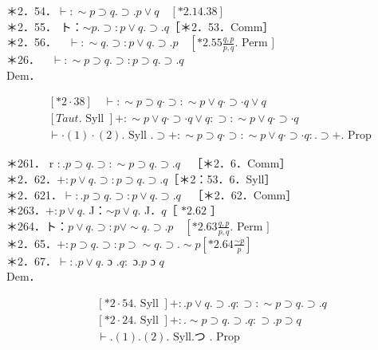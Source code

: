 \documentclass[10pt]{article}
\begin{document}
＊2．54．$\vdash: \sim p \supset q . \supset . p \vee q \quad[* 2.14 .38]$\\
＊2．55． ト：$\sim p . \supset: p \vee q . \supset . q$［＊2．53．Comm］\\
＊2．56．$\quad \vdash: \sim q . \supset: p \vee q . \supset . p \quad\left[* 2.55 \frac{q, p}{p, q}\right.$. Perm $]$\\
＊26．$\quad \vdash: \sim p \supset q . \supset: p \supset q . \supset . q$\\
Dem．


\begin{align*}
& {[* 2 \cdot 38] \quad \vdash: \sim p \supset q \cdot \supset: \sim p \vee q \cdot \supset \cdot q \vee q}  \tag{1}\\
& {[T a u t . \text { Syll }]+: \sim p \vee q \cdot \supset \cdot q \vee q: \supset: \sim p \vee q \cdot \supset \cdot q}  \tag{2}\\
& \vdash \cdot(1) \cdot(2) . \text { Syll } . \supset+: \sim p \supset q \cdot \supset: \sim p \vee q \cdot \supset \cdot q: . \supset+. \text { Prop }
\end{align*}


＊261． r $: . p \supset q . \supset: \sim p \supset q . \supset . q \quad$［＊2．6．Comm］\\
＊2．62．$+: p \vee q . \supset: p \supset q . \supset . q$［＊2：53．6．Syll］\\
＊2．621．$\vdash: . p \supset q . \supset: p \vee q . \supset . q \quad$［＊2．62．Comm］\\
＊263．$+: p \vee q$. J：$\sim p \vee q$. J．$q$［ $* 2.62$ ］\\
＊264．ト：$p \vee q . \supset: p \vee \sim q . \supset . p \quad\left[* 2.63 \frac{q, p}{p, q}\right.$. Perm $]$\\
＊2．65．$+: p \supset q . \supset: p \supset \sim q . \supset . \sim p\left[* 2.64 \frac{\sim p}{p}\right]$\\
＊2．67．$\vdash: . p \vee q$. ɔ $. q:$ ɔ.$p$ ɔ $q$\\
Dem．


\begin{align*}
& {[* 2 \cdot 54 . \text { Syll }]+: . p \vee q . \supset . q: \supset: \sim p \supset q . \supset . q}  \tag{1}\\
& {[* 2 \cdot 24 . \text { Syll }]+: . \sim p \supset q . \supset . q: \supset . p \supset q}  \tag{2}\\
& \vdash .(1) .(2) . \text { Syll.つ } \text {. Prop }
\end{align*}
\end{document}
